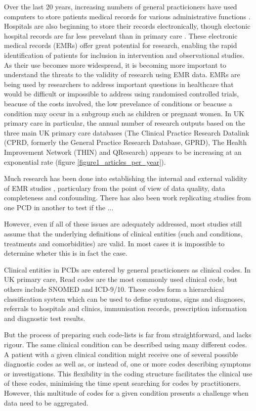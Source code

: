 \documentclass[10pt]{article}
\begin{document}
Over the last 20 years, increasing numbers of general practicioners have used computers to store patients medical records for various administrative functions \cite{Purves1996}. Hospitals are also beginning to store their records electronically, though electonic hospital records are far less prevelant than in primary care \cite{Ashish2009}. These electronic medical records (EMRs) offer great potential for research, enabling the rapid identification of patients for inclusion in intervention and observational studies. As their use becomes more widespread, it is becoming more important to understand the threats to the validity of research using EMR data. EMRs are being used by researchers to address important questions in healthcare that would be difficult or impossible to address using randomised controlled trials, beacuse of the costs involved, the low prevelance of conditions or beacuse a condition may occur in a subgroup such as children or pregnant women. In UK primary care in particular, the annual number of research outputs based on the three main UK primary care databases (The Clinical Practice Research Datalink (CPRD, formerly the General Practice Research Database, GPRD), The Health Improvement Network (THIN) and QResearch) appears to be increasing at an exponential rate (figure \ref{figure1_articles_per_year}). 


Much research has been done into establishing the internal and external validity of EMR studies \cite{Herrett2010}, particulary from the point of view of data quality, data completeness and confounding.  There has also been work replicating studies from one PCD in another to test if the ...

However, even if all of these issues are adequately addressed, most studies still assume that the underlying definitions of clinical entities (such and conditions, treatments and comorbidities) are valid.  In most cases it is impossible to determine wheter this is in fact the case. 

Clinical entities in PCDs are entered by general practicioners as clinical codes.  In UK primary care, Read codes are the most commonly used clinical code, but others include SNOMED and ICD-9/10.  These codes form a hierarchical classification system which can be used to define symtoms, signs and diagnoses, referrals to hospitals and clinics, immunisation records, prescription information and diagnostic test results.


But the process of preparing such code-lists is far from straightforward, and lacks rigour. The same clinical condition can be described using many different codes. A patient with a given clinical condition might receive one of several possible diagnostic codes as well as, or instead of, one or more codes describing symptoms or investigations. This flexibility in the coding structure facilitates the clinical use of these codes, minimising the time spent searching for codes by practitioners. However, this multitude of codes for a given condition presents a challenge when data need to be aggregated.
\end{document}
